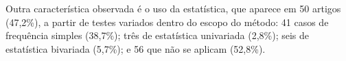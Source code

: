 Outra característica observada é o uso da estatística, que aparece em 50
artigos (47,2\%), a partir de testes variados dentro do escopo do
método: 41 casos de frequência simples (38,7\%); três de estatística univariada (2,8\%); seis de estatística bivariada (5,7\%); e 56 que não se aplicam (52,8\%).

